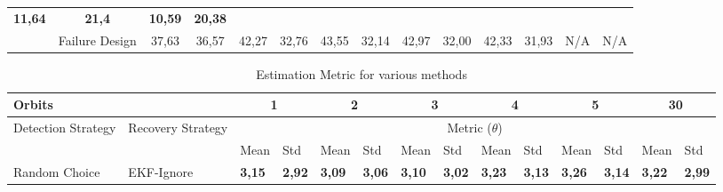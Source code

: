 \documentclass[letterpaper, 10 pt, conference]{ieeeconf}  %
\begin{document}
\begin{table*}[]
\begin{tabular}{@{}llllllllllllll@{}}
		\multicolumn{1}{c|}{\textbf{11,64}} &
		\multicolumn{1}{c|}{\textbf{21,4}} &
		\multicolumn{1}{c|}{\textbf{10,59}} &
		\multicolumn{1}{c|}{\textbf{20,38}} \\ \cmidrule(l){2-14} 
		\multicolumn{1}{|l|}{} &
		\multicolumn{1}{l|}{Failure Design} &
		\multicolumn{1}{c|}{37,63} &
		\multicolumn{1}{c|}{36,57} &
		\multicolumn{1}{c|}{42,27} &
		\multicolumn{1}{c|}{32,76} &
		\multicolumn{1}{c|}{43,55} &
		\multicolumn{1}{c|}{32,14} &
		\multicolumn{1}{c|}{42,97} &
		\multicolumn{1}{c|}{32,00} &
		\multicolumn{1}{c|}{42,33} &
		\multicolumn{1}{c|}{31,93} &
		\multicolumn{1}{c|}{N/A} &
		\multicolumn{1}{c|}{N/A} \\ \bottomrule
	\end{tabular}
\end{table*}


\begin{table*}[]
	\label{Table: Estimation Metric for various methods}
	\caption{Estimation Metric for various methods}
\begin{tabular}{@{}llllllllllllll@{}}
	\toprule
	\multicolumn{2}{l}{Orbits} &
	\multicolumn{2}{c}{1} &
	\multicolumn{2}{c}{2} &
	\multicolumn{2}{c}{3} &
	\multicolumn{2}{c}{4} &
	\multicolumn{2}{c}{5} &
	\multicolumn{2}{c}{30} \\ \midrule
	\multicolumn{1}{|l|}{\multirow{2}{*}{Detection Strategy}} &
	\multicolumn{1}{l|}{\multirow{2}{*}{Recovery Strategy}} &
	\multicolumn{12}{c|}{Metric ($\theta$)} \\ \cmidrule(l){3-14} 
	\multicolumn{1}{|l|}{} &
	\multicolumn{1}{l|}{} &
	\multicolumn{1}{l|}{Mean} &
	\multicolumn{1}{l|}{Std} &
	\multicolumn{1}{l|}{Mean} &
	\multicolumn{1}{l|}{Std} &
	\multicolumn{1}{l|}{Mean} &
	\multicolumn{1}{l|}{Std} &
	\multicolumn{1}{l|}{Mean} &
	\multicolumn{1}{l|}{Std} &
	\multicolumn{1}{l|}{Mean} &
	\multicolumn{1}{l|}{Std} &
	\multicolumn{1}{l|}{Mean} &
	\multicolumn{1}{l|}{Std} \\ \midrule
	\multicolumn{1}{|l|}{\multirow{4}{*}{Random Choice}} &
	\multicolumn{1}{l|}{EKF-Ignore} &
	\multicolumn{1}{l|}{\textbf{3,15}} &
	\multicolumn{1}{l|}{\textbf{2,92}} &
	\multicolumn{1}{l|}{\textbf{3,09}} &
	\multicolumn{1}{l|}{\textbf{3,06}} &
	\multicolumn{1}{l|}{\textbf{3,10}} &
	\multicolumn{1}{l|}{\textbf{3,02}} &
	\multicolumn{1}{l|}{\textbf{3,23}} &
	\multicolumn{1}{l|}{\textbf{3,13}} &
	\multicolumn{1}{l|}{\textbf{3,26}} &
	\multicolumn{1}{l|}{\textbf{3,14}} &
	\multicolumn{1}{l|}{\textbf{3,22}} &
	\multicolumn{1}{l|}{\textbf{2,99}} \\ \cmidrule(l){2-14} 

\end{tabular}
\end{table*}
\end{document}

